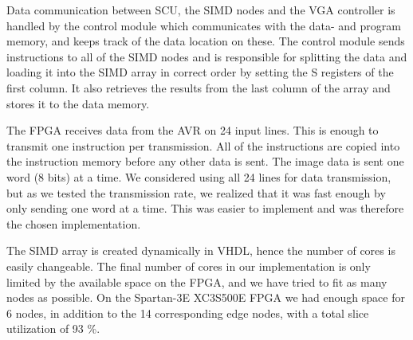 Data communication between \ac{SCU}, the \ac{SIMD} nodes and the \ac{VGA}
controller is handled by the control module which communicates with the data-
and program memory, and keeps track of the data location on these. The control
module sends instructions to all of the \ac{SIMD} nodes and is responsible for
splitting the data and loading it into the \ac{SIMD} array in correct order by
setting the S registers of the first column. It also retrieves the results from
the last column of the array and stores it to the data memory.

The \ac{FPGA} receives data from the AVR on 24 input lines. This is enough to
transmit one instruction per transmission. All of the instructions are copied
into the instruction memory before any other data is sent. The image data is
sent one word (8 bits) at a time. We considered using all 24 lines for data
transmission, but as we tested the transmission rate, we realized that it was
fast enough by only sending one word at a time. This was easier to
implement and was therefore the chosen implementation.

The \ac{SIMD} array is created dynamically in \ac{VHDL}, hence the
number of cores is easily changeable. The final number of cores in our
implementation is only limited by the available space on the \ac{FPGA},
and we have tried to fit as many nodes as possible. On the Spartan-3E
XC3S500E \ac{FPGA} we had enough space for 6 nodes, in addition to the
14 corresponding edge nodes, with a total slice utilization of 93 \%.
